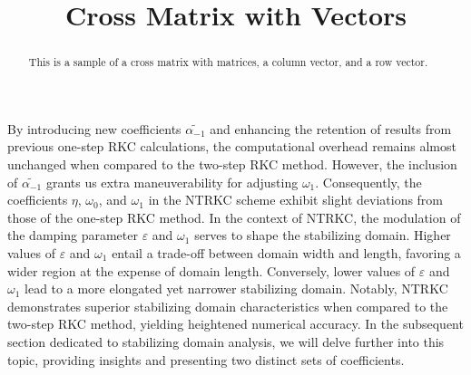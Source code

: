 \documentclass[review]{elsarticle}
\begin{document}
\begin{frontmatter}

\title{Cross Matrix with Vectors}

\begin{abstract}
This is a sample of a cross matrix with matrices, a column vector, and a row vector.
\end{abstract}

\end{frontmatter}




By introducing new coefficients $\tilde{\alpha_{-1}}$ and
 enhancing the retention of results from previous one-step RKC 
 calculations, the computational overhead remains almost unchanged 
 when compared to the two-step RKC method. However, the inclusion 
 of $\tilde{\alpha_{-1}}$ grants us extra maneuverability for
  adjusting $\omega_{1}$. Consequently, the coefficients
   $\eta$, $\omega_{0}$, and $\omega_{1}$ in the NTRKC
    scheme exhibit slight deviations from those of the 
    one-step RKC method. In the context of NTRKC, the
     modulation of the damping parameter $\varepsilon$ 
     and $\omega_{1}$ serves to shape the stabilizing 
     domain. Higher values of $\varepsilon$ and $\omega_{1}$ entail a 
     trade-off between domain width and length, favoring a wider 
     region at the expense of domain length. Conversely, lower 
     values of $\varepsilon$ and $\omega_{1}$ lead to a more
      elongated yet narrower stabilizing domain. Notably, 
      NTRKC demonstrates superior stabilizing domain
       characteristics when compared to the two-step RKC method, yielding 
       heightened numerical accuracy. In the subsequent section 
       dedicated to stabilizing domain analysis, we will delve further 
       into this topic, providing insights and presenting two distinct
        sets of coefficients.
\end{document}
